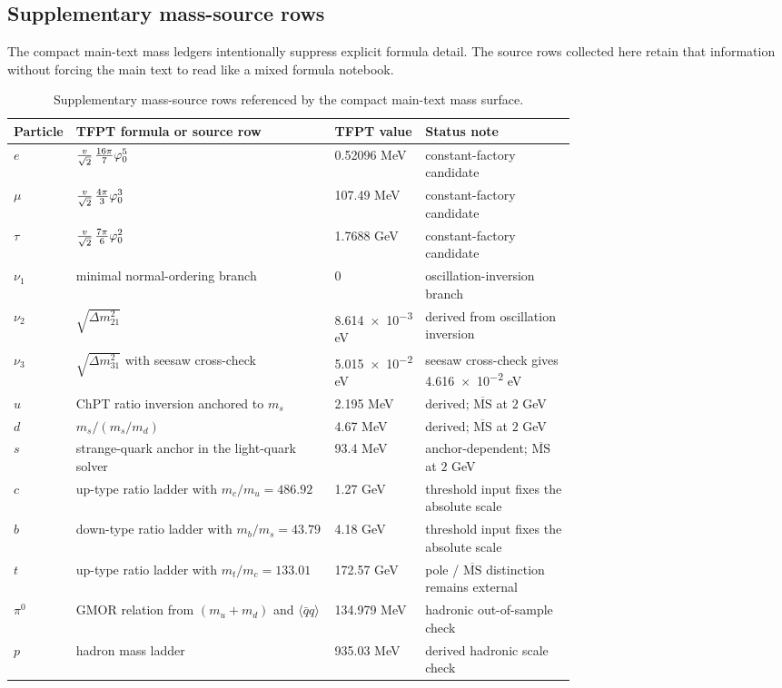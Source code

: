 \subsection{Supplementary mass-source rows}

The compact main-text mass ledgers intentionally suppress explicit formula detail. The source rows collected here retain that information without forcing the main text to read like a mixed formula notebook.

\begin{table}[H]
\centering
\scriptsize
\begin{tabularx}{\linewidth}{@{}>{\raggedright\arraybackslash}p{0.10\linewidth}>{\raggedright\arraybackslash}p{0.46\linewidth}>{\raggedleft\arraybackslash}p{0.16\linewidth}Y@{}}
\toprule
Particle & TFPT formula or source row & TFPT value & Status note \\
\midrule
$e$ & $\tfrac{v}{\sqrt2}\,\tfrac{16\pi}{7}\varphi_0^5$ & \num{0.52096} MeV & constant-factory candidate \\
$\mu$ & $\tfrac{v}{\sqrt2}\,\tfrac{4\pi}{3}\varphi_0^3$ & \num{107.49} MeV & constant-factory candidate \\
$\tau$ & $\tfrac{v}{\sqrt2}\,\tfrac{7\pi}{6}\varphi_0^2$ & \num{1.7688} GeV & constant-factory candidate \\
$\nu_1$ & minimal normal-ordering branch & $0$ & oscillation-inversion branch \\
$\nu_2$ & $\sqrt{\Delta m_{21}^2}$ & \num{8.614e-3} eV & derived from oscillation inversion \\
$\nu_3$ & $\sqrt{\Delta m_{31}^2}$ with seesaw cross-check & \num{5.015e-2} eV & seesaw cross-check gives \num{4.616e-2} eV \\
$u$ & ChPT ratio inversion anchored to $m_s$ & \num{2.195} MeV & derived; $\overline{\mathrm{MS}}$ at $2$ GeV \\
$d$ & $m_s/(m_s/m_d)$ & \num{4.67} MeV & derived; $\overline{\mathrm{MS}}$ at $2$ GeV \\
$s$ & strange-quark anchor in the light-quark solver & \num{93.4} MeV & anchor-dependent; $\overline{\mathrm{MS}}$ at $2$ GeV \\
$c$ & up-type ratio ladder with $m_c/m_u=\num{486.92}$ & \num{1.27} GeV & threshold input fixes the absolute scale \\
$b$ & down-type ratio ladder with $m_b/m_s=\num{43.79}$ & \num{4.18} GeV & threshold input fixes the absolute scale \\
$t$ & up-type ratio ladder with $m_t/m_c=\num{133.01}$ & \num{172.57} GeV & pole / $\overline{\mathrm{MS}}$ distinction remains external \\
$\pi^0$ & GMOR relation from $(m_u+m_d)$ and $\langle\bar qq\rangle$ & \num{134.979} MeV & hadronic out-of-sample check \\
$p$ & hadron mass ladder & \num{935.03} MeV & derived hadronic scale check \\
\bottomrule
\end{tabularx}
\caption{Supplementary mass-source rows referenced by the compact main-text mass surface.}
\label{tab:mass-source-supplement}
\end{table}

